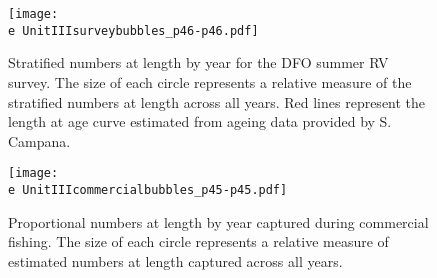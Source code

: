\documentclass[11pt]{article}
\newcommand{\e}{/home/ecomod_data/redfish/figures/}
\begin{document}
\begin{landscape}
\begin{figure}
\centering
    
    \texttt{[image: \\e UnitIIIsurveybubbles\_p46-p46.pdf]}
    \caption{Stratified numbers at length by year for the DFO summer RV survey. The size of each circle represents a relative measure of the stratified numbers at length across all years. Red lines represent the length at age curve estimated from ageing data provided by S. Campana.}

\end{figure}
\clearpage


\begin{figure}
\centering
    
    \texttt{[image: \\e UnitIIIcommercialbubbles\_p45-p45.pdf]}
    \caption{Proportional numbers at length by year captured during commercial fishing. The size of each circle represents a relative measure of estimated numbers at length captured across all years. }

\end{figure}
\clearpage
\end{landscape}
\end{document}
